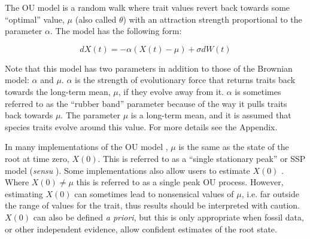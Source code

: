 \documentclass[a4paper,12pt]{article}
\begin{document}
   The OU model \citep{hansen1997stabilizing,Butler:2004aa} is a random walk where trait values revert back towards some ``optimal'' value, $\mu$ (also called $\theta$) with an attraction strength proportional to the parameter $\alpha$. 
    The model has the following form:
  
      \begin{equation}
        dX(t) = - \alpha (X(t) - \mu) + \sigma dW(t)
      \end{equation}
    
    \noindent
    Note that this model has two parameters in addition to those of the Brownian model: $\alpha$ and $\mu$. 
    $\alpha$ is the strength of evolutionary force that returns traits back towards the long-term mean, $\mu$, if they evolve away from it.
     $\alpha$ is sometimes referred to as the ``rubber band'' parameter because of the way it pulls traits back towards $\mu$.
    The parameter $\mu$ is a long-term mean, and it is assumed that species traits evolve around this value. 
    For more details see the Appendix.
    
    In many implementations of the OU model \citep[e.g. GEIGER][]{Harmon:2008aa}, $\mu$ is the same as the state of the root at time zero, $X(0)$. 
    This is referred to as a ``single stationary peak'' or SSP model (\textit{sensu} \citealp{Harmon:2010aa}). Some implementations also allow users to estimate $X(0)$ \citep[e.g. OUwie;][]{beaulieu2012modeling}. 
    Where $X(0) \neq \mu$ this is referred to as a single peak OU process. 
    However, estimating $X(0)$ can sometimes lead to nonsensical values of $\mu$, i.e. far outside the range of values for the trait, thus results should be interpreted with caution. $X(0)$ can also be defined \textit{a priori}, but this is only appropriate when fossil data, or other independent evidence, allow confident estimates of the root state. 
\end{document}
